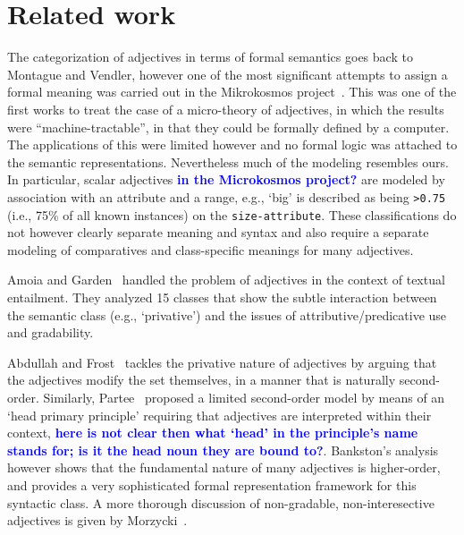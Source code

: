 \documentclass[11pt]{article}
\begin{document}
{\section{Related work}

The categorization of adjectives in terms of formal semantics goes back to Montague and Vendler, however one of the most significant attempts to assign a formal meaning was carried out in the Mikrokosmos project~\cite{raskin1995lexical}. This was one of the first works to treat the case of a micro-theory of adjectives, in which the results were ``machine-tractable'', in that they could be formally defined by a computer. The applications of this were limited however and no formal logic was attached to the semantic representations. Nevertheless much of the modeling resembles ours. In particular, scalar adjectives \textbf{\textcolor{blue}{in the Microkosmos project?}} are modeled by association with an attribute and a range, e.g., `big' is described as being {\tt >0.75} (i.e., 75\% of all known instances) on the {\tt size-attribute}. These classifications do not however clearly separate meaning and syntax and also require a separate modeling of comparatives and class-specific meanings for many adjectives.

Amoia and Garden~ handled the problem of adjectives in the context of textual entailment. They analyzed 15 classes that show the subtle interaction between the semantic class (e.g., `privative') and the issues of attributive/predicative use and gradability. 

Abdullah and Frost~ tackles the privative nature of adjectives by arguing that the adjectives modify the set themselves, in a manner that is naturally second-order. Similarly, Partee~ proposed a limited second-order model by means of an `head primary principle' requiring that adjectives are interpreted within their context, \textbf{\textcolor{blue}{here is not clear then what `head' in the principle's name stands for; is it the head noun they are bound to?}}. Bankston's analysis~ however shows that the fundamental nature of many adjectives is higher-order, and provides a very sophisticated formal representation framework for this syntactic class.
A more thorough discussion of non-gradable, non-interesective adjectives is given by Morzycki~.

}
\end{document}
